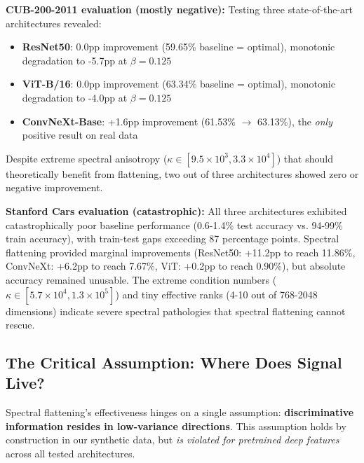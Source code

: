 \documentclass[11pt]{article}
\begin{document}
\textbf{CUB-200-2011 evaluation (mostly negative):} Testing three state-of-the-art architectures revealed:
\begin{itemize}
    \item \textbf{ResNet50}: 0.0pp improvement (59.65\% baseline = optimal), monotonic degradation to -5.7pp at $\beta=0.125$
    \item \textbf{ViT-B/16}: 0.0pp improvement (63.34\% baseline = optimal), monotonic degradation to -4.0pp at $\beta=0.125$
    \item \textbf{ConvNeXt-Base}: +1.6pp improvement (61.53\% $\to$ 63.13\%), the \emph{only} positive result on real data
\end{itemize}
Despite extreme spectral anisotropy ($\kappa \in [9.5 \times 10^3, 3.3 \times 10^4]$) that should theoretically benefit from flattening, two out of three architectures showed zero or negative improvement.

\textbf{Stanford Cars evaluation (catastrophic):} All three architectures exhibited catastrophically poor baseline performance (0.6-1.4\% test accuracy vs. 94-99\% train accuracy), with train-test gaps exceeding 87 percentage points. Spectral flattening provided marginal improvements (ResNet50: +11.2pp to reach 11.86\%, ConvNeXt: +6.2pp to reach 7.67\%, ViT: +0.2pp to reach 0.90\%), but absolute accuracy remained unusable. The extreme condition numbers ($\kappa \in [5.7 \times 10^4, 1.3 \times 10^5]$) and tiny effective ranks (4-10 out of 768-2048 dimensions) indicate severe spectral pathologies that spectral flattening cannot rescue.

\subsection{The Critical Assumption: Where Does Signal Live?}

Spectral flattening's effectiveness hinges on a single assumption: \textbf{discriminative information resides in low-variance directions}. This assumption holds by construction in our synthetic data, but \emph{is violated for pretrained deep features} across all tested architectures.
\end{document}
